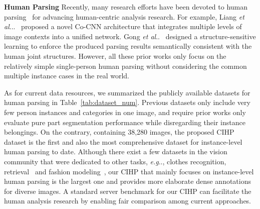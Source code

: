 \documentclass[runningheads]{llncs}
\makeatletter
\DeclareRobustCommand\onedot{\futurelet\@let@token\@onedot}
\def\@onedot{\ifx\@let@token.\else.\null\fi\xspace}
\def\eg{\emph{e.g}\onedot} \def\Eg{\emph{E.g}\onedot}
\def\etal{\emph{et al}\onedot}
\makeatother
\begin{document}
\textbf{Human Parsing}
Recently, many research efforts have been devoted to human parsing~\cite{Co-CNN,yamaguchi2012parsing,Yamaguchiparsing13,SimoSerraACCV2014,M-CNN,xia2015zoom,chen2015attention,Gong_2017_CVPR} for advancing human-centric analysis research. For example, Liang \etal.~\cite{Co-CNN} proposed a novel Co-CNN architecture that integrates multiple levels of image contexts into a unified network. Gong \etal~\cite{Gong_2017_CVPR} designed a structure-sensitive learning to enforce the produced parsing results semantically consistent with the human joint structures. However, all these prior works only focus on the relatively simple single-person human parsing without considering the common multiple instance cases in the real world.

As for current data resources, we summarized the publicly available datasets for human parsing in Table~\ref{tab:dataset_num}. Previous datasets only include very few person instances and categories in one image, and require prior works only evaluate pure part segmentation performance while disregarding their instance belongings. On the contrary, containing 38,280 images, the proposed CIHP dataset is the first and also the most comprehensive dataset for instance-level human parsing to date. Although there exist a few datasets in the vision community that were dedicated to other tasks, \eg, clothes recognition, retrieval~\cite{liuLQWTcvpr16DeepFashion,WhereToBuyItICCV15} and fashion modeling~\cite{simo2015neuroaesthetics}, our CIHP that mainly focuses on instance-level human parsing is the largest one and provides more elaborate dense annotations for diverse images. A standard server benchmark for our CIHP can facilitate the human analysis research by enabling fair comparison among current approaches.
\end{document}
